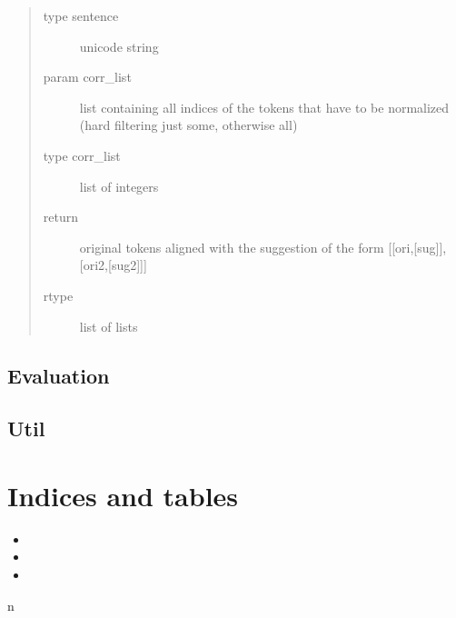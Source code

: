 \documentclass[letterpaper,10pt,english]{sphinxmanual}
\begin{document}
\begin{fulllineitems}
\begin{fulllineitems}
\begin{description}
\begin{quote}
\begin{description}
\item[{type sentence}] \leavevmode
unicode string

\item[{param corr\_list}] \leavevmode
list containing all indices of the tokens that have to be normalized (hard filtering just some, otherwise all)

\item[{type corr\_list}] \leavevmode
list of integers

\item[{return}] \leavevmode
original tokens aligned with the suggestion of the form {[}{[}ori,{[}sug{]}{]},{[}ori2,{[}sug2{]}{]}{]}

\item[{rtype}] \leavevmode
list of lists

\end{description}\end{quote}

\end{description}

\end{fulllineitems}


\end{fulllineitems}



\section{Evaluation}
\label{\detokenize{API:evaluation}}

\section{Util}
\label{\detokenize{API:util}}

\chapter{Indices and tables}
\label{\detokenize{index:indices-and-tables}}\begin{itemize}
\item {} 

\item {} 

\item {} 

\end{itemize}


\renewcommand{\indexname}{Python Module Index}
\begin{sphinxtheindex}
\def\bigletter#1{{\Large\sffamily#1}\nopagebreak\vspace{1mm}}
\bigletter{n}
\item {}
\end{sphinxtheindex}

\renewcommand{\indexname}{Index}
\printindex
\end{document}
